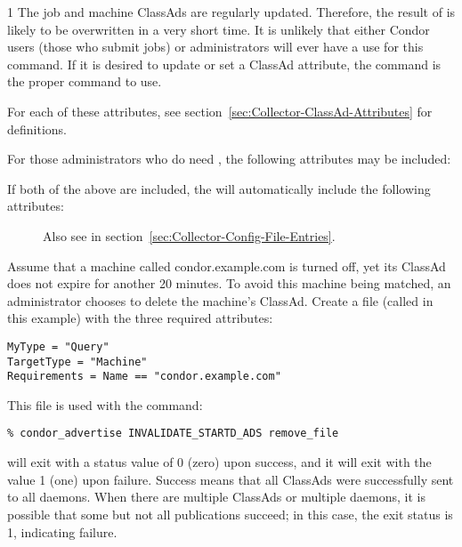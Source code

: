 \begin{ManPage}{\label{man-condor-advertise}}{1}
\GenRem
The job and machine ClassAds are regularly updated.
Therefore, the result of  is likely to be
overwritten in a very short time.
It is unlikely that either Condor users (those who submit jobs)
or administrators will ever have a use for this command.
If it is desired to update or set a ClassAd attribute, the
 command is the proper command to use.

For each of these attributes, 
see section~\ref{sec:Collector-ClassAd-Attributes} for definitions.


For those administrators who do need , the following
attributes may be included:

\begin{description}
\item[]
\item[]
\end{description}

If both of the above are included, the  will
automatically include the following attributes:

\begin{description}
\item[]
\item[]
\item[]
\item[] Also see 
  in section~\ref{sec:Collector-Config-File-Entries}.
\end{description}

\Examples

Assume that a machine called condor.example.com is turned off,
yet its  ClassAd does not expire for another 20 minutes.
To avoid this machine being matched, an administrator chooses
to delete the machine's  ClassAd.
Create a file (called  in this example)
with the three required attributes:
\begin{verbatim}
MyType = "Query"
TargetType = "Machine"
Requirements = Name == "condor.example.com"
\end{verbatim}

This file is used with the command:
\begin{verbatim}
% condor_advertise INVALIDATE_STARTD_ADS remove_file 
\end{verbatim}

\ExitStatus

 will exit with a status value of 0 (zero) upon
success, and it will exit with the value 1 (one) upon failure.
Success means that all ClassAds were successfully sent to all 
 daemons.
When there are multiple ClassAds or multiple  daemons,
it is possible that some but not all publications succeed;
in this case, the exit status is 1, indicating failure.

\end{ManPage}
